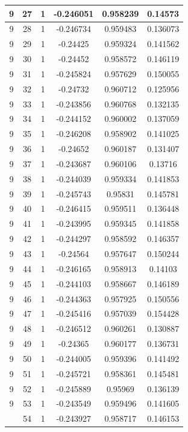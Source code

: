\documentclass[12pt,a4paper]{article}
\numberwithin{equation}{section}
\numberwithin{figure}{section}
\numberwithin{table}{section}
\begin{document}
\begin{longtable}{|c|c|c|c|c|c|}
9 & 27 & 1 & -0.246051 & 0.958239 & 0.14573 \\ \hline
9 & 28 & 1 & -0.246734 & 0.959483 & 0.136073 \\ \hline
9 & 29 & 1 & -0.24425 & 0.959324 & 0.141562 \\ \hline
9 & 30 & 1 & -0.24452 & 0.958572 & 0.146119 \\ \hline
9 & 31 & 1 & -0.245824 & 0.957629 & 0.150055 \\ \hline
9 & 32 & 1 & -0.24732 & 0.960712 & 0.125956 \\ \hline
9 & 33 & 1 & -0.243856 & 0.960768 & 0.132135 \\ \hline
9 & 34 & 1 & -0.244152 & 0.960002 & 0.137059 \\ \hline
9 & 35 & 1 & -0.246208 & 0.958902 & 0.141025 \\ \hline
9 & 36 & 1 & -0.24652 & 0.960187 & 0.131407 \\ \hline
9 & 37 & 1 & -0.243687 & 0.960106 & 0.13716 \\ \hline
9 & 38 & 1 & -0.244039 & 0.959334 & 0.141853 \\ \hline
9 & 39 & 1 & -0.245743 & 0.95831 & 0.145781 \\ \hline
9 & 40 & 1 & -0.246415 & 0.959511 & 0.136448 \\ \hline
9 & 41 & 1 & -0.243995 & 0.959345 & 0.141858 \\ \hline
9 & 42 & 1 & -0.244297 & 0.958592 & 0.146357 \\ \hline
9 & 43 & 1 & -0.24564 & 0.957647 & 0.150244 \\ \hline
9 & 44 & 1 & -0.246165 & 0.958913 & 0.14103 \\ \hline
9 & 45 & 1 & -0.244103 & 0.958667 & 0.146189 \\ \hline
9 & 46 & 1 & -0.244363 & 0.957925 & 0.150556 \\ \hline
9 & 47 & 1 & -0.245416 & 0.957039 & 0.154428 \\ \hline
9 & 48 & 1 & -0.246512 & 0.960261 & 0.130887 \\ \hline
9 & 49 & 1 & -0.24365 & 0.960177 & 0.136731 \\ \hline
9 & 50 & 1 & -0.244005 & 0.959396 & 0.141492 \\ \hline
9 & 51 & 1 & -0.245721 & 0.958361 & 0.145481 \\ \hline
9 & 52 & 1 & -0.245889 & 0.95969 & 0.136139 \\ \hline
9 & 53 & 1 & -0.243549 & 0.959496 & 0.141605 \\ \hline
\pagebreak
9 & 54 & 1 & -0.243927 & 0.958717 & 0.146153 \\ \hline

\end{longtable}
\end{document}

